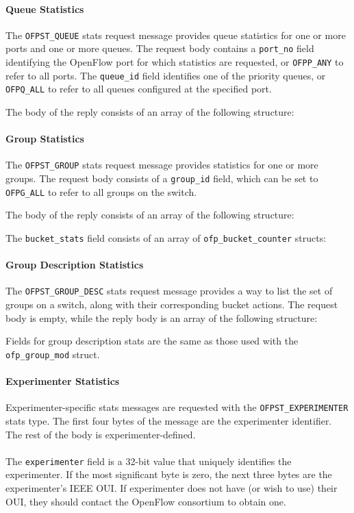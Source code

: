 

\paragraph{Queue Statistics}
The \verb|OFPST_QUEUE| stats request message provides queue statistics for one or more ports and one or more queues. The request body contains a \verb|port_no| field identifying the OpenFlow port for which statistics are requested, or \verb|OFPP_ANY| to refer to all ports. The \verb|queue_id| field identifies one of the priority queues, or \verb|OFPQ_ALL| to refer to all queues configured at the specified port.


The body of the reply consists of an array of the following structure:



\paragraph{Group Statistics}
The \verb|OFPST_GROUP| stats request message provides statistics for one or more groups.  The request body consists of a \verb|group_id| field, which can be set to \verb|OFPG_ALL| to refer to all groups on the switch.


The body of the reply consists of an array of the following structure:


The \verb|bucket_stats| field consists of an array of \verb|ofp_bucket_counter| structs:



\paragraph{Group Description Statistics}
The \verb|OFPST_GROUP_DESC| stats request message provides a way to list the set of groups on a switch, along with their corresponding bucket actions.  The request body is empty, while the reply body is an array of the following structure:


Fields for group description stats are the same as those used with the \verb|ofp_group_mod| struct.

\paragraph{Experimenter Statistics}
Experimenter-specific stats messages are requested with the \verb|OFPST_EXPERIMENTER| stats type. The first four bytes of the message are the experimenter identifier. The rest of the body is experimenter-defined.
\\\\
The \verb|experimenter| field is a 32-bit value that uniquely identifies the experimenter. If the most significant byte is zero, the next three bytes are the experimenter's IEEE OUI. If experimenter does not have (or wish to use) their OUI, they should contact the OpenFlow consortium to obtain one. 

